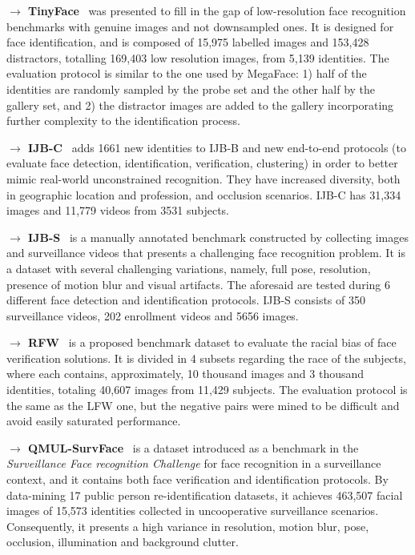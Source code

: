 \documentclass[class=report, crop=false, a4paper, 12pt]{standalone}
\begin{document}
\vspace{0.7\baselineskip}
\noindent\textbf{$\rightarrow$ TinyFace}~\autocite{chengLowResolutionFaceRecognition2019} was presented to fill in the gap of low-resolution face recognition benchmarks with genuine images and not downsampled ones. It is designed for face identification, and is composed of 15,975 labelled images and 153,428 distractors, totalling 169,403 low resolution images, from 5,139 identities. The evaluation protocol is similar to the one used by MegaFace: 1) half of the identities are randomly sampled by the probe set and the other half by the gallery set, and 2) the distractor images are added to the gallery incorporating further complexity to the identification process.

\vspace{0.7\baselineskip}
\noindent\textbf{$\rightarrow$ IJB-C}~\autocite{mazeIARPAJanusBenchmark2018} adds 1661 new identities to IJB-B and new end-to-end protocols (to evaluate face detection, identification, verification, clustering) in order to better mimic real-world unconstrained recognition. They have increased diversity, both in geographic location and profession, and occlusion scenarios. IJB-C has 31,334 images and 11,779 videos from 3531 subjects.

\vspace{0.7\baselineskip}
\noindent\textbf{$\rightarrow$ IJB-S}~\autocite{kalkaIJBIARPAJanus2018} is a manually annotated benchmark constructed by collecting images and surveillance videos that presents a challenging face recognition problem. It is a dataset with several challenging variations, namely, full pose, resolution, presence of motion blur and visual artifacts. The aforesaid are tested during 6 different face detection and identification protocols. IJB-S consists of 350 surveillance videos, 202 enrollment videos and 5656 images. 

\vspace{0.7\baselineskip}
\noindent\textbf{$\rightarrow$ RFW}~\autocite{wangRacialFacesWild2019} is a proposed benchmark dataset to evaluate the racial bias of face verification solutions. It is divided in 4 subsets regarding the race of the subjects, where each contains, approximately, 10 thousand images and 3 thousand identities, totaling 40,607 images from 11,429 subjects. The evaluation protocol is the same as the LFW one, but the negative pairs were mined to be difficult and avoid easily saturated performance.

\vspace{0.7\baselineskip}
\noindent\textbf{$\rightarrow$ QMUL-SurvFace}~\autocite{chengSurveillanceFaceRecognition2018} is a dataset introduced as a benchmark in the \textit{Surveillance Face recognition Challenge} for face recognition in a surveillance context, and it contains both face verification and identification protocols. By data-mining 17 public person re-identification datasets, it achieves 463,507 facial images of 15,573 identities collected in uncooperative surveillance scenarios. Consequently, it presents a high variance in resolution, motion blur, pose, occlusion, illumination and background clutter.
\end{document}
